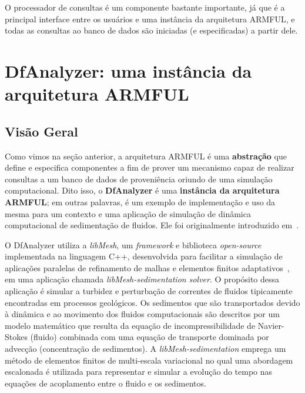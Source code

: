 O processador de consultas é um componente bastante importante, já que é a principal interface entre os usuários e uma instância da arquitetura ARMFUL, e todas as consultas ao banco de dados são iniciadas (e especificadas) a partir dele.

\section{DfAnalyzer: uma instância da arquitetura ARMFUL}

\subsection{Visão Geral}

Como vimos na seção anterior, a arquitetura ARMFUL é uma \textbf{abstração} que define e especifica componentes a fim de prover um mecanismo capaz de realizar consultas a um banco de dados de proveniência oriundo de uma simulação computacional. Dito isso, o \textbf{DfAnalyzer} é uma \textbf{instância da arquitetura ARMFUL}; em outras palavras, é um exemplo de implementação e uso da mesma para um contexto e uma aplicação de simulação de dinâmica computacional de sedimentação de fluidos. Ele foi originalmente introduzido em~\cite{silva2016situ}.

O DfAnalyzer utiliza a \textit{libMesh}, um \textit{framework} e biblioteca \textit{open-source} implementada na linguagem C++, desenvolvida para facilitar a simulação de aplicações paralelas de refinamento de malhas e elementos finitos adaptativos~\cite{boncz2008breaking}, em uma aplicação chamada \textit{libMesh-sedimentation solver}. O propósito dessa aplicação é simular a turbidez e perturbação de correntes de fluidos tipicamente encontradas em processos geológicos. Os sedimentos que são transportados devido à dinâmica e ao movimento dos fluidos computacionais são descritos por um modelo matemático que resulta da equação de incompressibilidade de Navier-Stokes (fluido) combinada com uma equação de transporte dominada por advecção (concentração de sedimentos). A \textit{libMesh-sedimentation} emprega um método de elementos finitos de multi-escala variacional no qual uma abordagem escalonada é utilizada para representar e simular a evolução do tempo nas equações de acoplamento entre o fluido e os sedimentos.

